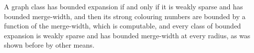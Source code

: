 \begin{theorem}[{[DT25, Cor.~1.8]}]
A graph class has bounded expansion if and only if it is weakly sparse and
has bounded merge-width, and then its strong colouring numbers are bounded
by a function of the merge-width, which is computable, and every class of
bounded expansion is weakly sparse and has bounded merge-width at every
radius, as was shown before by other means.
\end{theorem}
